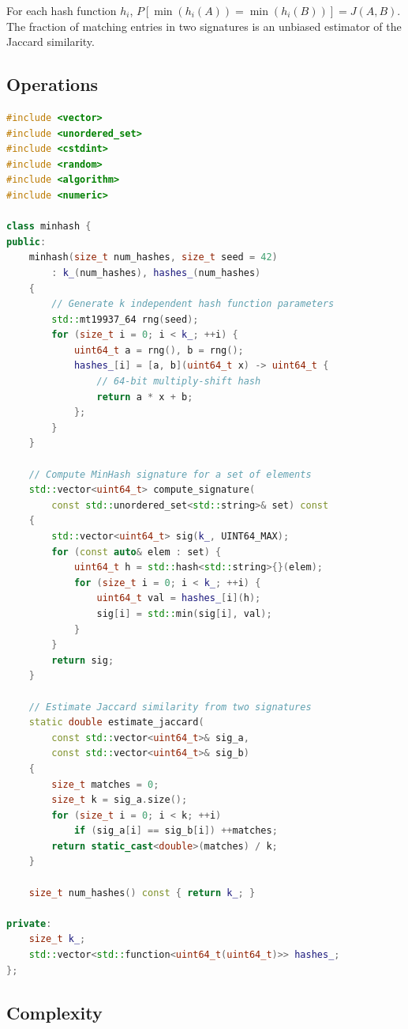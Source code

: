 \noindent For each hash function $h_i$, $P[\min(h_i(A)) = \min(h_i(B))] = J(A,B)$. The fraction of matching entries in two signatures is an unbiased estimator of the Jaccard similarity.

\subsection{Operations}

\begin{lstlisting}[language=C++]
#include <vector>
#include <unordered_set>
#include <cstdint>
#include <random>
#include <algorithm>
#include <numeric>

class minhash {
public:
    minhash(size_t num_hashes, size_t seed = 42)
        : k_(num_hashes), hashes_(num_hashes)
    {
        // Generate k independent hash function parameters
        std::mt19937_64 rng(seed);
        for (size_t i = 0; i < k_; ++i) {
            uint64_t a = rng(), b = rng();
            hashes_[i] = [a, b](uint64_t x) -> uint64_t {
                // 64-bit multiply-shift hash
                return a * x + b;
            };
        }
    }

    // Compute MinHash signature for a set of elements
    std::vector<uint64_t> compute_signature(
        const std::unordered_set<std::string>& set) const
    {
        std::vector<uint64_t> sig(k_, UINT64_MAX);
        for (const auto& elem : set) {
            uint64_t h = std::hash<std::string>{}(elem);
            for (size_t i = 0; i < k_; ++i) {
                uint64_t val = hashes_[i](h);
                sig[i] = std::min(sig[i], val);
            }
        }
        return sig;
    }

    // Estimate Jaccard similarity from two signatures
    static double estimate_jaccard(
        const std::vector<uint64_t>& sig_a,
        const std::vector<uint64_t>& sig_b)
    {
        size_t matches = 0;
        size_t k = sig_a.size();
        for (size_t i = 0; i < k; ++i)
            if (sig_a[i] == sig_b[i]) ++matches;
        return static_cast<double>(matches) / k;
    }

    size_t num_hashes() const { return k_; }

private:
    size_t k_;
    std::vector<std::function<uint64_t(uint64_t)>> hashes_;
};
\end{lstlisting}

\subsection{Complexity}

